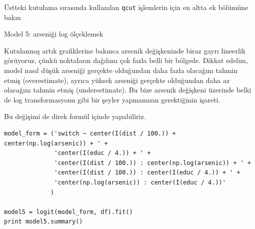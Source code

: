 \documentclass[12pt,fleqn]{article}\usepackage{../../common}
\begin{document}
Üstteki kutulama sırasında kullanılan \verb!qcut! işlemlerin
için en altta ek bölümüne bakın

Model 5: arseniği log ölçeklemek

Kutulanmış artık grafiklerine bakınca arsenik değişkeninde biraz gayrı lineerlik
görüyoruz, çünkü noktaların dağılımı çok fazla belli bir bölgede. Dikkat edelim,
model nasıl düşük arseniği gerçekte olduğundan daha fazla olacağını tahmin etmiş
(overestimate), ayrıca yüksek arseniği gerçekte olduğundan daha az olacağını
tahmin etmiş (underestimate). Bu bize arsenik değişkeni üzerinde belki de log
transformasyonu gibi bir şeyler yapmamızın gerektiğinin işareti.

Bu değişimi de direk formül içinde yapabiliriz.

\begin{verbatim}
model_form = ('switch ~ center(I(dist / 100.)) + center(np.log(arsenic)) + ' +
              'center(I(educ / 4.)) + ' +
              'center(I(dist / 100.)) : center(np.log(arsenic)) + ' + 
              'center(I(dist / 100.)) : center(I(educ / 4.)) + ' + 
              'center(np.log(arsenic)) : center(I(educ / 4.))'
             )

model5 = logit(model_form, df).fit()
print model5.summary()
\end{verbatim}
\end{document}
